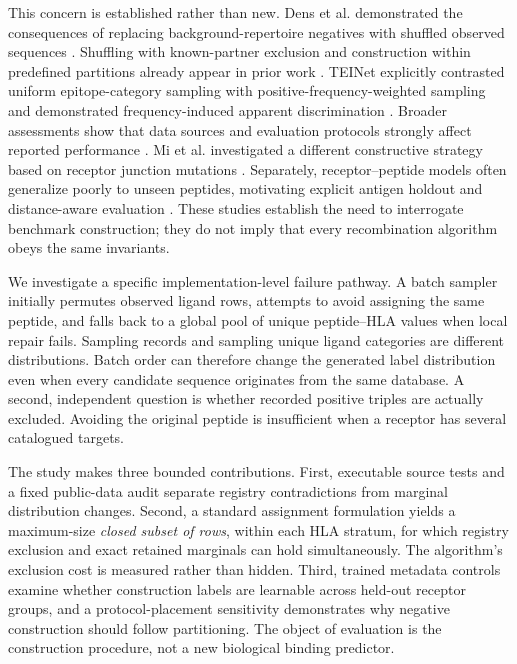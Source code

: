 \documentclass[pdflatex,sn-basic,Numbered]{sn-jnl}
\begin{document}
This concern is established rather than new. Dens et al. demonstrated the consequences of replacing background-repertoire negatives with shuffled observed sequences \cite{Dens2023}. Shuffling with known-partner exclusion and construction within predefined partitions already appear in prior work \cite{Moris2021,Korpela2023}. TEINet explicitly contrasted uniform epitope-category sampling with positive-frequency-weighted sampling and demonstrated frequency-induced apparent discrimination \cite{Jiang2023}. Broader assessments show that data sources and evaluation protocols strongly affect reported performance \cite{Deng2023,Drost2025,Lu2026}. Mi et al. investigated a different constructive strategy based on receptor junction mutations \cite{Mi2026}. Separately, receptor--peptide models often generalize poorly to unseen peptides, motivating explicit antigen holdout and distance-aware evaluation \cite{Grazioli2022,Castorina2025}. These studies establish the need to interrogate benchmark construction; they do not imply that every recombination algorithm obeys the same invariants.

We investigate a specific implementation-level failure pathway. A batch sampler initially permutes observed ligand rows, attempts to avoid assigning the same peptide, and falls back to a global pool of unique peptide--HLA values when local repair fails. Sampling records and sampling unique ligand categories are different distributions. Batch order can therefore change the generated label distribution even when every candidate sequence originates from the same database. A second, independent question is whether recorded positive triples are actually excluded. Avoiding the original peptide is insufficient when a receptor has several catalogued targets.

The study makes three bounded contributions. First, executable source tests and a fixed public-data audit separate registry contradictions from marginal distribution changes. Second, a standard assignment formulation yields a maximum-size \emph{closed subset of rows}, within each HLA stratum, for which registry exclusion and exact retained marginals can hold simultaneously. The algorithm's exclusion cost is measured rather than hidden. Third, trained metadata controls examine whether construction labels are learnable across held-out receptor groups, and a protocol-placement sensitivity demonstrates why negative construction should follow partitioning. The object of evaluation is the construction procedure, not a new biological binding predictor.
\end{document}
